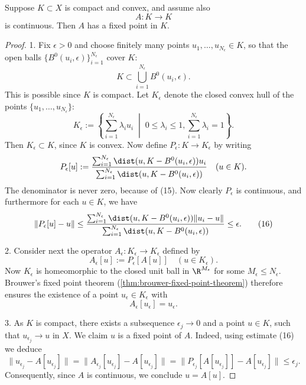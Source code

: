 \begin{theorem}
\label{thm:schauders-fixed-point-theorem}
Suppose $K \subset X$ is compact and convex, and assume also
\[
A : K \to K
\]
is continuous. Then $A$ has a fixed point in $K$.
\end{theorem}
\begin{proof}
1. Fix $\epsilon > 0$ and choose finitely many points $u_1, \ldots, u_{N_\epsilon} \in K$, so that the open balls $\{B^0(u_i, \epsilon)\}_{i=1}^{N_\epsilon}$ cover $K$:
\[
K \subset \bigcup_{i=1}^{N_\epsilon} B^0(u_i, \epsilon).
\tag{15}
\]
This is possible since $K$ is compact. Let $K_{\epsilon}$ denote the closed convex hull of the points $\{u_1, \ldots, u_{N_{\epsilon}}\}$:
\[
K_{\epsilon} := \left\{\sum_{i=1}^{N_{\epsilon}} \lambda_i u_i \;\middle|\; 0 \leq \lambda_i \leq 1, \sum_{i=1}^{N_{\epsilon}} \lambda_i = 1\right\}.
\]
Then $K_{\epsilon} \subset K$, since $K$ is convex. Now define $P_{\epsilon} : K \to K_{\epsilon}$ by writing
\[
P_{\epsilon}[u] := \frac{\sum_{i=1}^{N_{\epsilon}} \dist(u, K - B^0(u_i, \epsilon))u_i}{\sum_{i=1}^{N_{\epsilon}} \dist(u, K - B^0(u_i, \epsilon))} \quad (u \in K).
\]
The denominator is never zero, because of (15). Now clearly $P_{\epsilon}$ is continuous, and furthermore for each $u \in K$, we have
\[
\|P_{\epsilon}[u] - u\| \leq \frac{\sum_{i=1}^{N_{\epsilon}} \dist(u, K - B^0(u_i, \epsilon))\|u_i - u\|}{\sum_{i=1}^{N_{\epsilon}} \dist(u, K - B^0(u_i, \epsilon))} \leq \epsilon.
\tag{16}
\]

2. Consider next the operator $A_{\epsilon} : K_{\epsilon} \to K_{\epsilon}$ defined by
\[
A_{\epsilon}[u] := P_{\epsilon}[A[u]] \quad (u \in K_{\epsilon}).
\]
Now $K_{\epsilon}$ is homeomorphic to the closed unit ball in $\R^{M_{\epsilon}}$ for some $M_{\epsilon} \leq N_{\epsilon}$. Brouwer's fixed point theorem (\cref{thm:brouwer-fixed-point-theorem}) therefore ensures the existence of a point $u_{\epsilon} \in K_{\epsilon}$ with
\[
A_{\epsilon}[u_{\epsilon}] = u_{\epsilon}.
\]

3. As $K$ is compact, there exists a subsequence $\epsilon_j \to 0$ and a point $u \in K$, such that $u_{\epsilon_j} \to u$ in $X$. We claim $u$ is a fixed point of $A$. Indeed, using estimate (16) we deduce
\[
\|u_{\epsilon_j} - A[u_{\epsilon_j}]\| = \|A_{\epsilon_j}[u_{\epsilon_j}] - A[u_{\epsilon_j}]\| = \|P_{\epsilon_j}[A[u_{\epsilon_j}]] - A[u_{\epsilon_j}]\| \leq \epsilon_j.
\]
Consequently, since $A$ is continuous, we conclude $u = A[u]$.
\end{proof}


